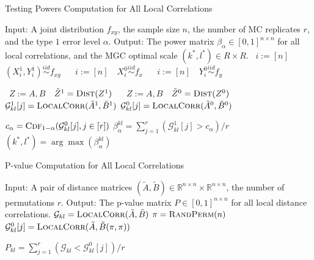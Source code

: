 \documentclass[11pt]{article}
\newcommand{\Real}{\mathbb{R}}
\newcommand{\G}{\mathcal{G}}
\newcommand{\Linefor}[2]{%
    \State \algorithmicfor\ {#1}\ \algorithmicdo\ {#2} \algorithmicend\ \algorithmicfor%
}
\begin{document}
\begin{algorithm}
\caption{Testing Powers Computation for All Local Correlations}
\label{alg3}
\begin{algorithmic}[1]
\Statex Input: A joint distribution $f_{xy}$, the sample size $n$, the number of MC replicates $r$, and the type $1$ error level $\alpha$.
\Statex Output: The power matrix $\beta_{\alpha} \in [0,1]^{n \times n}$ for all local correlations, and the MGC optimal scale $(k^{*},l^{*}) \in R \times R$.
\Linefor{$i:=[n]$}{$(X^{1}_{i},Y^{1}_{i}) \stackrel{iid}{\sim} f_{xy}$} 
\Linefor{$i:=[n]$}{$X^{0}_{i} \stackrel{iid}{\sim} f_{x}$} 
\Linefor{$i:=[n]$}{$Y^{0}_{i} \stackrel{iid}{\sim} f_{y}$} 
\Linefor{$Z:=A,B$}{$\tilde{Z}^{1}=\textsc{Dist}(Z^{1})$} 
\Linefor{$Z:=A,B$}{$\tilde{Z}^{0}=\textsc{Dist}(Z^{0})$} 
\State $\G_{kl}^{1}[j]=\textsc{LocalCorr}(\tilde{A}^{1},\tilde{B}^{1})$  
\State $\G_{kl}^{0}[j]=\textsc{LocalCorr}(\tilde{A}^{0},\tilde{B}^{0})$  
\EndFor

\State $c_{\alpha}=\textsc{Cdf}_{1-\alpha}(\G^{0}_{kl}[j],j \in [r])$ 
\State $\beta_{\alpha}^{kl}=\sum_{j=1}^{r}(\G^{1}_{kl}[j]>c_{\alpha}) / r$ 
\EndFor
\State $(k^{*},l^{*})=\arg\max(\beta_{\alpha}^{kl})$ 
\EndFunction
\end{algorithmic}
\end{algorithm}

\begin{algorithm}
\caption{P-value Computation for All Local Correlations}
\label{alg4}
\begin{algorithmic}[1]
\Statex Input: A pair of distance matrices $(\tilde{A},\tilde{B}) \in \Real^{n \times n} \times \Real^{n \times n}$, the number of permutations $r$.
\Statex Output: The p-value matrix $P \in [0,1]^{n \times n}$ for all local distance correlations.
\State $\G_{kl}=\textsc{LocalCorr}(\tilde{A},\tilde{B})$ 
\State $\pi=\textsc{RandPerm}(n)$ 
\State $\G_{kl}^{0}[j]=\textsc{LocalCorr}(\tilde{A},\tilde{B}(\pi,\pi))$ 
\EndFor

\State $P_{kl}=\sum_{j=1}^{r}(\G_{kl}<\G^{0}_{kl}[j])/r$ 
\EndFor
\EndFunction
\end{algorithmic}
\end{algorithm}
\end{document}
